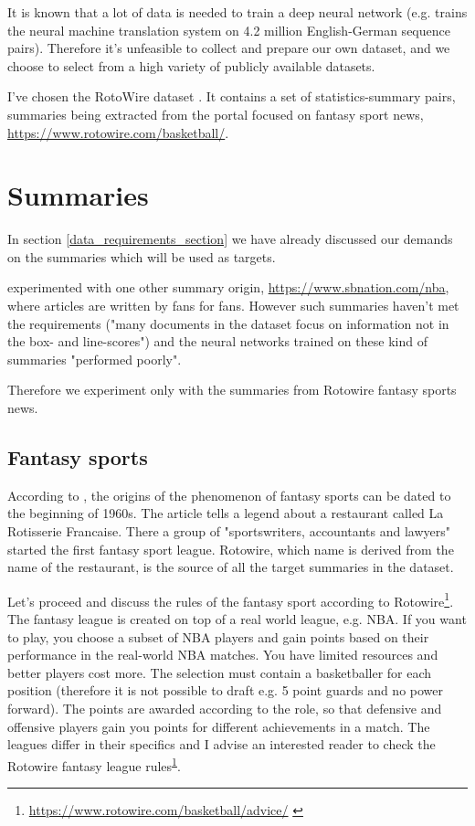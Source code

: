 It is known that a lot of data is needed to train a deep neural network (e.g. \citep{sennrich2016} trains the neural machine translation system on 4.2 million English-German sequence pairs). Therefore it's unfeasible to collect and prepare our own dataset, and we choose to select from a high variety of publicly available datasets.

I've chosen the RotoWire dataset \citep{wiseman2017}. It contains a set of statistics-summary pairs, summaries being extracted from the portal focused on fantasy sport news, \url{https://www.rotowire.com/basketball/}.

\section{Summaries}

In section \ref{data_requirements_section} we have already discussed our demands on the summaries which will be used as targets.

\citep{wiseman2017} experimented with one other summary origin, \url{https://www.sbnation.com/nba}, where articles are written by fans for fans. However such summaries haven't met the requirements ("many documents in the dataset focus on information not in the box- and line-scores") and the neural networks trained on these kind of summaries "performed poorly".

Therefore we experiment only with the summaries from Rotowire fantasy sports news.

\subsection{Fantasy sports}

According to \citep{Tozzi1999}, the origins of the phenomenon of fantasy sports can be dated to the beginning of 1960s. The article tells a legend about a restaurant called La Rotisserie Francaise. There a group of "sportswriters, accountants and lawyers" started the first fantasy sport league. Rotowire, which name is derived from the name of the restaurant, is the source of all the target summaries in the dataset.

Let's proceed and discuss the rules of the fantasy sport according to Rotowire\footnote{\url{https://www.rotowire.com/basketball/advice/} \label{footnote_2_fs}}. The fantasy league is created on top of a real world league, e.g. NBA. If you want to play, you choose a subset of NBA players and gain points based on their performance in the real-world NBA matches. You have limited resources and better players cost more. The selection must contain a basketballer for each position (therefore it is not possible to draft e.g. 5 point guards and no power forward). The points are awarded according to the role, so that defensive and offensive players gain you points for different achievements in a match. The leagues differ in their specifics and I advise an interested reader to check the Rotowire fantasy league rules\textsuperscript{\ref{footnote_2_fs}}.

